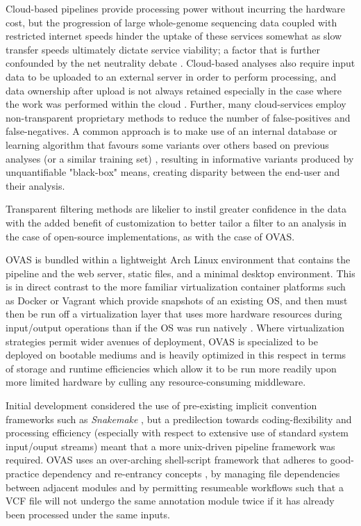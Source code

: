 \documentclass[twocolumn]{bmcart}%
\def\app{OVAS}
\begin{document}
Cloud-based pipelines provide processing power without incurring the hardware cost, but the progression of large whole-genome sequencing data coupled with restricted internet speeds hinder the uptake of these services somewhat as slow transfer speeds ultimately dictate service viability; a factor that is further confounded by the net neutrality debate \cite{netneutrality}. Cloud-based analyses also require input data to be uploaded to an external server in order to perform processing, and data ownership after upload is not always retained especially in the case where the work was performed within the cloud \cite{reed2010information}. Further, many cloud-services employ non-transparent proprietary methods to reduce the number of false-positives and false-negatives. A common approach is to make use of an internal database or learning algorithm that favours some variants over others based on previous analyses (or a similar training set) \cite{pabinger2014survey}, resulting in informative variants produced by unquantifiable "black-box" means, creating disparity between the end-user and their analysis.

Transparent filtering methods are likelier to instil greater confidence in the data with the added benefit of customization to better tailor a filter to an analysis in the case of open-source implementations, as with the case of \app{}.


\app{} is bundled within a lightweight Arch Linux environment that contains the pipeline and the web server, static files, and a minimal desktop environment. 
This is in direct contrast to the more familiar virtualization container platforms such as Docker or Vagrant which provide snapshots of an existing OS, and then must then be run off a virtualization layer that uses more hardware resources during input/output operations than if the OS was run natively \cite{virtualcomparison}. Where virtualization strategies permit wider avenues of deployment, \app{} is specialized to be deployed on bootable mediums and is heavily optimized in this respect in terms of storage and runtime efficiencies which allow it to be run more readily upon more limited hardware by culling any resource-consuming middleware.



Initial development considered the use of pre-existing implicit convention frameworks such as \textit{Snakemake} \cite{koster2012snakemake}, but a predilection towards coding-flexibility and processing efficiency (especially with respect to extensive use of standard system input/ouput streams) meant that a more unix-driven pipeline framework was required. \app{} uses an over-arching shell-script framework that adheres to good-practice dependency and re-entrancy concepts \cite{leipzigreview}, by managing file dependencies between adjacent modules and by permitting resumeable workflows such that a VCF file will not undergo the same annotation module twice if it has already been processed under the same inputs.
\end{document}
